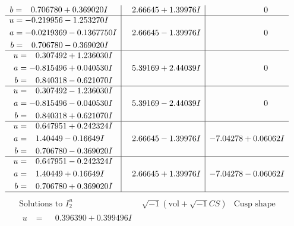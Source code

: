 \documentclass[1p]{elsarticle_modified}
\theoremstyle{definition}
\newcommand{\I}{\sqrt{-1}}
\begin{document}
$$\begin{array}{c|c|c}
\begin{aligned}
b &= \phantom{-}0.706780 + 0.369020 I\end{aligned}
 & \phantom{-}2.66645 + 1.39976 I & \phantom{-0.000000 } 0 \\ \hline\begin{aligned}
u &= -0.219956 - 1.253270 I \\
a &= -0.0219369 - 0.1367750 I \\
b &= \phantom{-}0.706780 - 0.369020 I\end{aligned}
 & \phantom{-}2.66645 - 1.39976 I & \phantom{-0.000000 } 0 \\ \hline\begin{aligned}
u &= \phantom{-}0.307492 + 1.236030 I \\
a &= -0.815496 + 0.040530 I \\
b &= \phantom{-}0.840318 - 0.621070 I\end{aligned}
 & \phantom{-}5.39169 + 2.44039 I & \phantom{-0.000000 } 0 \\ \hline\begin{aligned}
u &= \phantom{-}0.307492 - 1.236030 I \\
a &= -0.815496 - 0.040530 I \\
b &= \phantom{-}0.840318 + 0.621070 I\end{aligned}
 & \phantom{-}5.39169 - 2.44039 I & \phantom{-0.000000 } 0 \\ \hline\begin{aligned}
u &= \phantom{-}0.647951 + 0.242324 I \\
a &= \phantom{-}1.40449 - 0.16649 I \\
b &= \phantom{-}0.706780 - 0.369020 I\end{aligned}
 & \phantom{-}2.66645 - 1.39976 I & -7.04278 + 0.06062 I \\ \hline\begin{aligned}
u &= \phantom{-}0.647951 - 0.242324 I \\
a &= \phantom{-}1.40449 + 0.16649 I \\
b &= \phantom{-}0.706780 + 0.369020 I\end{aligned}
 & \phantom{-}2.66645 + 1.39976 I & -7.04278 - 0.06062 I\\
 \hline 
 \end{array}$$\newpage$$\begin{array}{c|c|c}  
\text{Solutions to }I^u_{2}& \I (\text{vol} + \sqrt{-1}CS) & \text{Cusp shape}\\
 \hline 
\begin{aligned}
u &= \phantom{-}0.396390 + 0.399496 I \\

\end{aligned}
\end{array}$$
\end{document}
